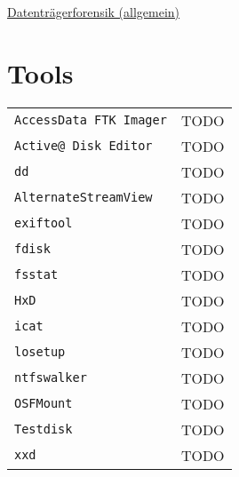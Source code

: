 \raggedright
\footnotesize
\begin{multicols}{3}	
	\setlength{\premulticols}{1pt}
	\setlength{\postmulticols}{1pt}
	\setlength{\multicolsep}{1pt}
	\setlength{\columnsep}{2pt}

\begin{center}
     \Large{\underline{Datenträgerforensik (allgemein)}} \\
\end{center}

\section{Tools}
\begin{tabular}{@{}p{\the\MyLen}
		@{}p{\linewidth-\the\MyLen}@{}}
	\texttt{AccessData FTK Imager} &  TODO\\
	\texttt{Active@ Disk Editor} &  TODO\\
	\texttt{dd} &  TODO\\
	\texttt{AlternateStreamView} &  TODO\\
	\texttt{exiftool} &  TODO\\
	\texttt{fdisk} &  TODO\\
	\texttt{fsstat} &  TODO\\
	\texttt{HxD} &  TODO\\
	\texttt{icat} &  TODO\\
	\texttt{losetup} &  TODO\\
	\texttt{ntfswalker} &  TODO\\
	\texttt{OSFMount} &  TODO\\
	\texttt{Testdisk} &  TODO\\
	\texttt{xxd} &  TODO\\
\end{tabular}
\lipsum
\end{multicols}